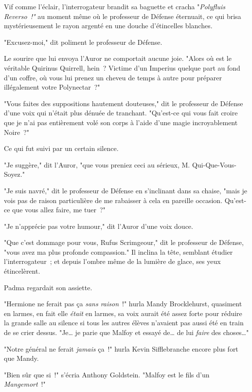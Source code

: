 Vif comme l'éclair, l'interrogateur brandit sa baguette et cracha "\emph{Polyfluis Reverso~!"} au moment même où le professeur de Défense éternuait, ce qui brisa mystérieusement le rayon argenté en une douche d'étincelles blanches.

"Excusez-moi," dit poliment le professeur de Défense.

Le sourire que lui envoya l'Auror ne comportait aucune joie. "Alors où est le véritable Quirinus Quirrell, hein~? Victime d'un Imperius quelque part au fond d'un coffre, où vous lui prenez un cheveu de temps à autre pour préparer illégalement votre Polynectar~?"

"Vous faites des suppositions hautement douteuses," dit le professeur de Défense d'une voix qui n'était plus dénuée de tranchant. "Qu'est-ce qui vous fait croire que je n'ai pas entièrement volé son corps à l'aide d'une magie incroyablement Noire~?"

Ce qui fut suivi par un certain silence.

"Je suggère," dit l'Auror, "que vous preniez ceci au sérieux, M. Qui-Que-Vous-Soyez."

"Je suis navré," dit le professeur de Défense en s'inclinant dans sa chaise, "mais je vois pas de raison particulière de me rabaisser à cela en pareille occasion. Qu'est-ce que vous allez faire, me tuer~?"

"Je n'apprécie pas votre humour," dit l'Auror d'une voix douce.

"Que c'est dommage pour vous, Rufus Scrimgeour," dit le professeur de Défense, "vous avez ma plus profonde compassion." Il inclina la tête, semblant étudier l'interrogateur~; et depuis l'ombre même de la lumière de glace, ses yeux étincelèrent.

\later

Padma regardait son assiette.

"Hermione ne ferait pas ça \emph{sans raison}~!" hurla Mandy Brocklehurst, quasiment en larmes, en fait elle \emph{était} en larmes, sa voix aurait été assez forte pour réduire la grande salle au silence si tous les autres élèves n'avaient pas aussi été en train de se crier dessus. "Je… je parie que Malfoy et essayé de… de lui \emph{faire} des choses…"

"Notre général ne ferait \emph{jamais} ça~!" hurla Kevin Sifflebranche encore plus fort que Mandy.

"Bien sûr que si~!" s'écria Anthony Goldstein. "Malfoy est le fils d'un \emph{Mangemort}~!"

\later

